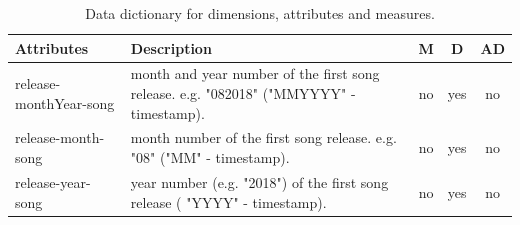 \documentclass[12pt]{article}
\begin{document}
\begin{table}[h!]
\begin{center}
\begin{tabular}{@{}|l|p{7cm}|c|c|c|@{}} 
\toprule
Attributes & Description & M & D & AD \\ [0.5ex] \midrule
release-monthYear-song & month and year number of the first song release. e.g. "082018" ("MMYYYY" - timestamp).& no & yes & no \\ \hline
release-month-song & month number of the first song release. e.g. "08" ("MM" - timestamp).& no & yes & no \\ \hline
release-year-song & year number (e.g. "2018") of the first song release ( "YYYY" - timestamp). & no & yes & no \\ \bottomrule \midrule
\end{tabular}
\caption{Data dictionary for dimensions, attributes and measures.}
\label{table:2}
\end{center}
\end{table}
\end{document}
